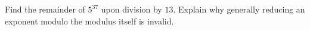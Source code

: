 Find the remainder of $5^{37}$ upon division by $13$. Explain why generally reducing an exponent modulo the modulus itself is invalid.
